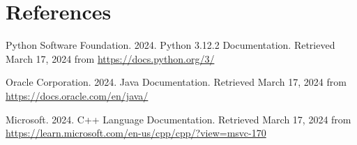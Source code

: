 \documentclass[sigconf, nonacm, authorversion, language=english, 12pt]{acmart}
\begin{document}
\section*{References}
\begin{enumerate}[label={[\arabic*]}]
  \item Python Software Foundation. 2024. Python 3.12.2 Documentation. Retrieved March 17, 2024 from \href{https://docs.python.org/3/}{https://docs.python.org/3/}\\

  \item Oracle Corporation. 2024. Java Documentation. Retrieved March 17, 2024 from \href{https://docs.oracle.com/en/java/}{https://docs.oracle.com/en/java/}\\

  \item Microsoft. 2024. C++ Language Documentation. Retrieved March 17, 2024 from \href{https://learn.microsoft.com/en-us/cpp/cpp/?view=msvc-170}{https://learn.microsoft.com/en-us/cpp/cpp/?view=msvc-170}





\end{enumerate}
\end{document}

